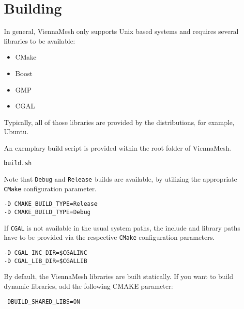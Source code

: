 \section{Building}

In general, ViennaMesh only supports Unix based systems and requires 
several libraries to be available:

\begin{itemize}
   \item CMake~\cite{cmake}
   \item Boost~\cite{boost}
   \item GMP~\cite{gmp}
   \item CGAL~\cite{cgal}
\end{itemize}

Typically, all of those libraries are provided by 
the distributions, for example, Ubuntu. 

An exemplary build script is provided within the root folder of ViennaMesh. 
\begin{exaipd}
\begin{Verbatim}
build.sh
\end{Verbatim}
\end{exaipd}

Note that \texttt{Debug} and \texttt{Release} builds are available, by utilizing 
the appropriate \texttt{CMake} configuration parameter.
\begin{exaipd}
\begin{Verbatim}
-D CMAKE_BUILD_TYPE=Release
-D CMAKE_BUILD_TYPE=Debug
\end{Verbatim}
\end{exaipd}

If \texttt{CGAL} is not available in the usual system paths, the include and 
library paths have to be provided via the 
respective \texttt{CMake} configuration parameters.
\begin{exaipd}
\begin{Verbatim}
-D CGAL_INC_DIR=$CGALINC
-D CGAL_LIB_DIR=$CGALLIB
\end{Verbatim}
\end{exaipd}

By default, the ViennaMesh libraries are built statically. If you want to 
build dynamic libraries, add the following CMAKE parameter:
\begin{exaipd}
\begin{Verbatim}
-DBUILD_SHARED_LIBS=ON
\end{Verbatim}
\end{exaipd}

